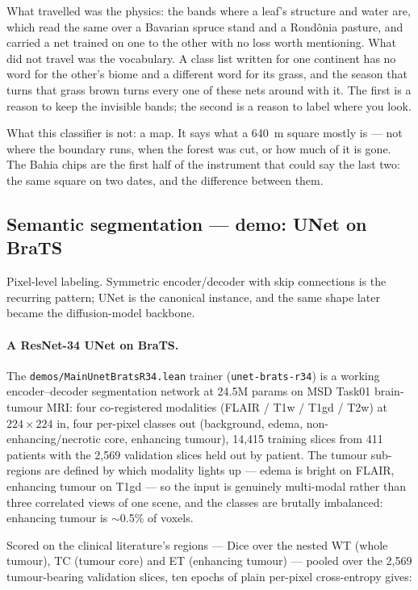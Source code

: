\noindent What travelled was the physics: the bands where a leaf's
structure and water are, which read the same over a Bavarian spruce stand
and a Rond\^onia pasture, and carried a net trained on one to the other
with no loss worth mentioning. What did not travel was the vocabulary. A
class list written for one continent has no word for the other's biome and
a different word for its grass, and the season that turns that grass brown
turns every one of these nets around with it. The first is a reason to keep
the invisible bands; the second is a reason to label where you look.

\medskip\noindent What this classifier is not: a map. It says what a 640~m
square mostly is --- not where the boundary runs, when the forest was cut,
or how much of it is gone. The Bahia chips are the first half of the
instrument that could say the last two: the same square on two dates, and
the difference between them.

\subsection{Semantic segmentation --- demo: UNet on BraTS}
\label{sec:bestiary_segmentation}

Pixel-level labeling. Symmetric encoder/decoder with skip connections
is the recurring pattern; UNet is the canonical instance, and the same
shape later became the diffusion-model backbone.

\paragraph{A ResNet-34 UNet on BraTS.} The
\texttt{demos/MainUnetBratsR34.lean} trainer (\texttt{unet-brats-r34}) is a
working encoder--decoder segmentation network at 24.5M params on MSD Task01
brain-tumour MRI: four co-registered modalities (FLAIR / T1w / T1gd / T2w) at
$224 \times 224$ in, four per-pixel classes out (background, edema,
non-enhancing/necrotic core, enhancing tumour), 14{,}415 training slices from
411 patients with the 2{,}569 validation slices held out by patient. The
tumour sub-regions are defined by which modality lights up --- edema is bright
on FLAIR, enhancing tumour on T1gd --- so the input is genuinely multi-modal
rather than three correlated views of one scene, and the classes are brutally
imbalanced: enhancing tumour is $\sim$0.5\% of voxels.

Scored on the clinical literature's regions --- Dice over the nested WT (whole
tumour), TC (tumour core) and ET (enhancing tumour) --- pooled over the 2{,}569
tumour-bearing validation slices, ten epochs of plain per-pixel cross-entropy
gives:

